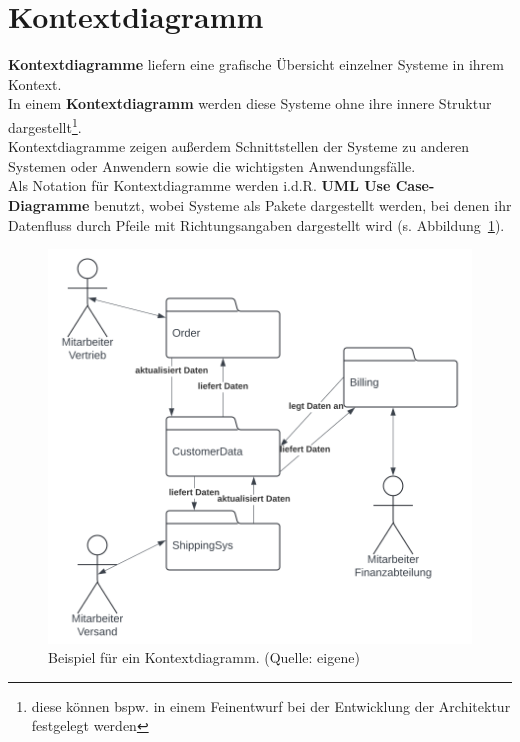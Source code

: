 \section{Kontextdiagramm}

\begin{tcolorbox}[title=Kontextdiagramm]
    \textbf{Kontextdiagramme} liefern eine grafische Übersicht einzelner Systeme in ihrem Kontext.\\
    \noindent
    In einem  \textbf{Kontextdiagramm} werden diese Systeme ohne ihre innere Struktur dargestellt\footnote{
        diese können bspw. in einem Feinentwurf bei der Entwicklung der Architektur festgelegt werden
    }.\\
    Kontextdiagramme zeigen außerdem Schnittstellen der Systeme zu anderen Systemen oder Anwendern sowie die wichtigsten Anwendungsfälle.\\
    Als Notation für Kontextdiagramme werden i.d.R. \textbf{UML Use Case-Diagramme} benutzt, wobei Systeme als Pakete dargestellt werden, bei denen ihr Datenfluss durch Pfeile mit Richtungsangaben dargestellt wird (s. Abbildung~\ref{fig:contextdiagram_cc}).
\end{tcolorbox}


\begin{figure}
    \centering
    \includegraphics[scale=0.4]{chapters/Anhang/CheatSheets/img/contextdiagram}
    \caption{Beispiel für ein Kontextdiagramm. (Quelle: eigene)}
    \label{fig:contextdiagram_cc}
\end{figure}

